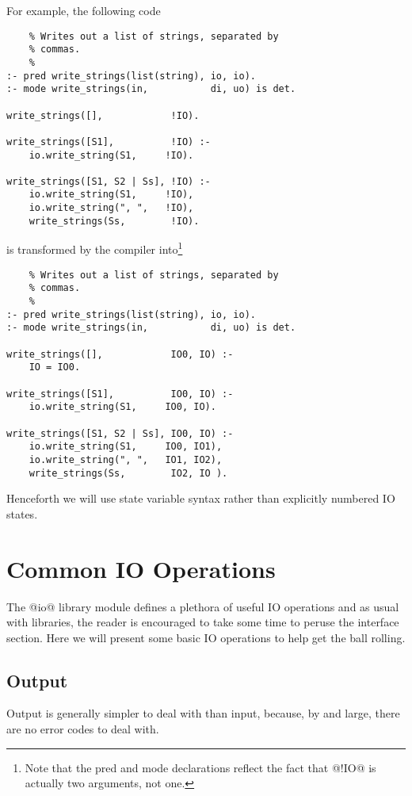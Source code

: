 For example, the following code
\begin{verbatim}
    % Writes out a list of strings, separated by
    % commas.
    %
:- pred write_strings(list(string), io, io).
:- mode write_strings(in,           di, uo) is det.

write_strings([],            !IO).

write_strings([S1],          !IO) :-
    io.write_string(S1,     !IO).

write_strings([S1, S2 | Ss], !IO) :-
    io.write_string(S1,     !IO),
    io.write_string(", ",   !IO),
    write_strings(Ss,        !IO).
\end{verbatim}
is transformed by the compiler into\footnote{Note that the pred and mode declarations reflect
the fact that @!IO@ is actually two arguments, not one.}
\begin{verbatim}
    % Writes out a list of strings, separated by
    % commas.
    %
:- pred write_strings(list(string), io, io).
:- mode write_strings(in,           di, uo) is det.

write_strings([],            IO0, IO) :-
    IO = IO0.

write_strings([S1],          IO0, IO) :-
    io.write_string(S1,     IO0, IO).

write_strings([S1, S2 | Ss], IO0, IO) :-
    io.write_string(S1,     IO0, IO1),
    io.write_string(", ",   IO1, IO2),
    write_strings(Ss,        IO2, IO ).
\end{verbatim}
Henceforth we will use state variable syntax rather than
explicitly numbered IO states.

\section{Common IO Operations}

The @io@ library module defines a plethora of useful IO
operations and as usual with libraries, the reader is
encouraged to take some time to peruse the interface section.
Here we will present some basic IO operations to help get the
ball rolling.

\subsection{Output}

Output is generally simpler to deal with than input,
because, by and large, there are no error codes to deal
with.

